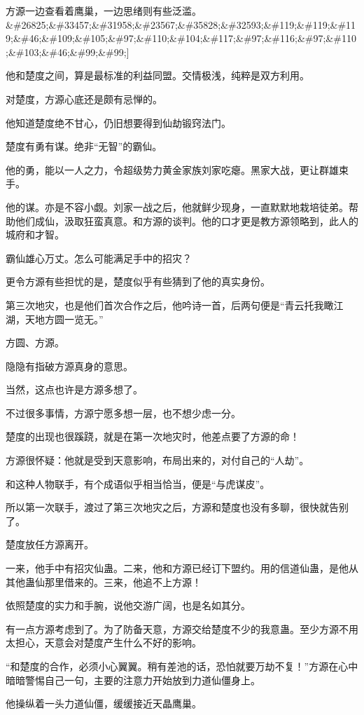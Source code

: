 \begin{this_body}
方源一边查看着鹰巢，一边思绪则有些泛滥。\&\#26825;\&\#33457;\&\#31958;\&\#23567;\&\#35828;\&\#32593;\&\#119;\&\#119;\&\#119;\&\#46;\&\#109;\&\#105;\&\#97;\&\#110;\&\#104;\&\#117;\&\#97;\&\#116;\&\#97;\&\#110;\&\#103;\&\#46;\&\#99;\&\#99;]

他和楚度之间，算是最标准的利益同盟。交情极浅，纯粹是双方利用。

对楚度，方源心底还是颇有忌惮的。

他知道楚度绝不甘心，仍旧想要得到仙劫锻窍法门。

楚度有勇有谋。绝非“无智”的霸仙。

他的勇，能以一人之力，令超级势力黄金家族刘家吃瘪。黑家大战，更让群雄束手。

他的谋。亦是不容小觑。刘家一战之后，他就鲜少现身，一直默默地栽培徒弟。帮助他们成仙，汲取狂蛮真意。和方源的谈判。他的口才更是教方源领略到，此人的城府和才智。

霸仙雄心万丈。怎么可能满足手中的招灾？

更令方源有些担忧的是，楚度似乎有些猜到了他的真实身份。

第三次地灾，也是他们首次合作之后，他吟诗一首，后两句便是“青云托我瞰江湖，天地方圆一览无。”

方圆、方源。

隐隐有指破方源真身的意思。

当然，这点也许是方源多想了。

不过很多事情，方源宁愿多想一层，也不想少虑一分。

楚度的出现也很蹊跷，就是在第一次地灾时，他差点要了方源的命！

方源很怀疑：他就是受到天意影响，布局出来的，对付自己的“人劫”。

和这种人物联手，有个成语似乎相当恰当，便是“与虎谋皮”。

所以第一次联手，渡过了第三次地灾之后，方源和楚度也没有多聊，很快就告别了。

楚度放任方源离开。

一来，他手中有招灾仙蛊。二来，他和方源已经订下盟约。用的信道仙蛊，是他从其他蛊仙那里借来的。三来，他追不上方源！

依照楚度的实力和手腕，说他交游广阔，也是名如其分。

有一点方源考虑到了。为了防备天意，方源交给楚度不少的我意蛊。至少方源不用太担心，天意会对楚度产生什么不好的影响。

“和楚度的合作，必须小心翼翼。稍有差池的话，恐怕就要万劫不复！”方源在心中暗暗警惕自己一句，主要的注意力开始放到力道仙僵身上。

他操纵着一头力道仙僵，缓缓接近天晶鹰巢。


\end{this_body}

